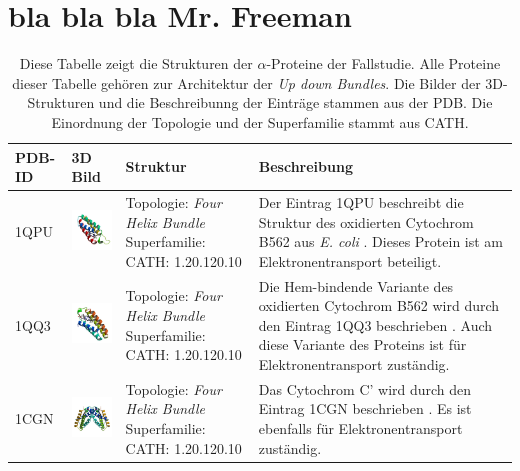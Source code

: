 \documentclass{article}
\begin{document}
\section{bla bla bla Mr. Freeman}

\begin{table}
\begin{center}


\caption{Diese Tabelle zeigt die Strukturen der $\alpha$-Proteine der Fallstudie. Alle Proteine dieser Tabelle geh\"oren zur Architektur der \textit{Up down Bundles}. Die Bilder der 3D-Strukturen und die Beschreibunng der Eintr\"age stammen aus der PDB. Die Einordnung der Topologie und der Superfamilie stammt aus CATH. }
\begin{tabular}{ | C{9mm} | C{30mm} | C{29mm} | C{38mm} | }
\hline
PDB-ID & 3D Bild & Struktur & Beschreibung \\ \hline
1QPU  & \includegraphics[width=30mm, trim= -10 -5 -5 -10]{1QPU_asym_r_500.jpg} & Topologie: \newline \textit{Four Helix Bundle} \newline Superfamilie: CATH: 1.20.120.10 & Der Eintrag 1QPU beschreibt die Struktur des oxidierten Cytochrom B562 aus \textit{E. coli} \cite{1qpu}. Dieses Protein ist am Elektronentransport beteiligt. \\ \hline
1QQ3  & \includegraphics[width=30mm, trim= -10 -5 -5 -10]{1QQ3_asym_r_500.jpg} & Topologie: \newline \textit{Four Helix Bundle} \newline Superfamilie: CATH: 1.20.120.10  & Die Hem-bindende Variante des oxidierten Cytochrom B562 wird durch den Eintrag 1QQ3 beschrieben \cite{1qq3}. Auch diese Variante des Proteins ist f\"ur Elektronentransport zust\"andig. \\ \hline
1CGN  & \includegraphics[width=30mm, trim= -10 -5 -5 -10]{1CGN_bio_r_500.jpg} & Topologie: \newline \textit{Four Helix Bundle} \newline Superfamilie: CATH: 1.20.120.10  & Das Cytochrom C' wird durch den Eintrag 1CGN beschrieben \cite{1cgn}. Es ist ebenfalls f\"ur Elektronentransport zust\"andig. \\ \hline

\end{tabular}
\end{center}
\end{table}
\end{document}
